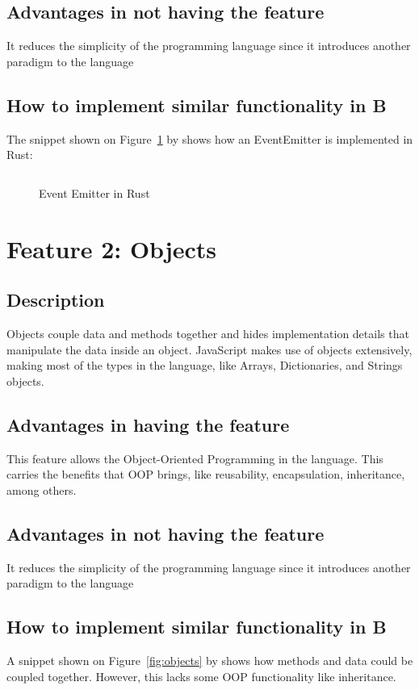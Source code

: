 \documentclass{article}
\begin{document}
  \subsection{Advantages in not having the feature}
  It reduces the simplicity of the programming language since it introduces
  another paradigm to the language

  \subsection{How to implement similar functionality in B}
  The snippet shown on Figure~\ref{fig:event-emitter} by \cite{shemsedinov}
  shows how an EventEmitter is implemented in Rust:

  \begin{figure}[H]
    \inputminted[fontsize=\small]{rust}{samples/rust/event-emitter.rs}
    \caption{Event Emitter in Rust}
    \label{fig:event-emitter}
  \end{figure}


  \section{Feature 2: Objects}
  \subsection{Description}
  Objects couple data and methods together and hides implementation details that
  manipulate the data inside an object. JavaScript makes use of objects
  extensively, making most of the types in the language, like Arrays,
  Dictionaries, and Strings objects.

  \subsection{Advantages in having the feature}
  This feature allows the Object-Oriented Programming in the language. This
  carries the benefits that OOP brings, like reusability, encapsulation,
  inheritance, among others.

  \subsection{Advantages in not having the feature}
  It reduces the simplicity of the programming language since it introduces
  another paradigm to the language

  \subsection{How to implement similar functionality in B}
  A snippet shown on Figure~\ref{fig:objects} by \cite{klabnik_nichols_2018}
  shows how methods and data could be coupled together. However, this lacks some
  OOP functionality like inheritance.
\end{document}
